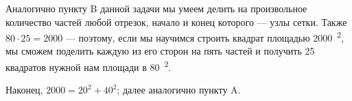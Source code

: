 \begin{itemize}
\begin{multicols}{2}
\end{multicols}

\itC Аналогично пункту B данной задачи мы умеем делить на произвольное количество частей любой отрезок, начало и конец которого — узлы сетки. Также $80 \cdot 25 = 2000$ — поэтому, если мы научимся строить квадрат площадью \SI{2000}{^2}, мы сможем поделить каждую из его сторон на пять частей и получить 25 квадратов нужной нам площади в \SI{80}{^2}.

Наконец, $2000 = 20^2 + 40^2$; далее аналогично пункту A.
\end{itemize}
